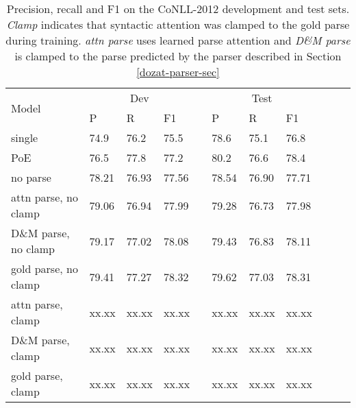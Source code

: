 \documentclass[11pt,a4paper]{article}
\begin{document}
\begin{table*}
\begin{tabular}{lllllllllll}
\multirow{2}{*}{Model} & \multicolumn{3}{c}{Dev} & & \multicolumn{3}{c}{Test} \\ \cline{2-4} \cline{6-8}
& P & R & F1 & &  P & R & F1 \\ \hline \hline
\citet{he2017deep} single & 74.9 & 76.2 & 75.5 & &  78.6 & 75.1 & 76.8\\
\citet{he2017deep} PoE & 76.5 & 77.8 & 77.2  & &  80.2 & 76.6 & 78.4\\ \hline
no parse &  78.21  & 76.93  & 77.56 & &  78.54  &  76.90  & 77.71  \\
attn parse, no clamp &  79.06 &  76.94 &  77.99 & & 79.28 &  76.73  & 77.98 \\
D\&M parse, no clamp & 79.17 &  77.02  & 78.08 & & 79.43 &  76.83  & 78.11 \\
gold parse, no clamp & 79.41 &  77.27 &  78.32 & & 79.62  & 77.03 &  78.31\\
attn parse, clamp & xx.xx & xx.xx & xx.xx & & xx.xx & xx.xx & xx.xx \\
D\&M parse, clamp & xx.xx & xx.xx & xx.xx & & xx.xx & xx.xx & xx.xx \\
gold parse, clamp & xx.xx & xx.xx & xx.xx & & xx.xx & xx.xx & xx.xx \\
\end{tabular}
\caption{Precision, recall and F1 on the CoNLL-2012 development and test sets. \emph{Clamp} indicates that syntactic attention was clamped to the gold parse during training. \emph{attn parse} uses learned parse attention and \emph{D\&M parse} is clamped to the parse predicted by the parser described in Section \ref{dozat-parser-sec}}
\end{table*}
\end{document}
